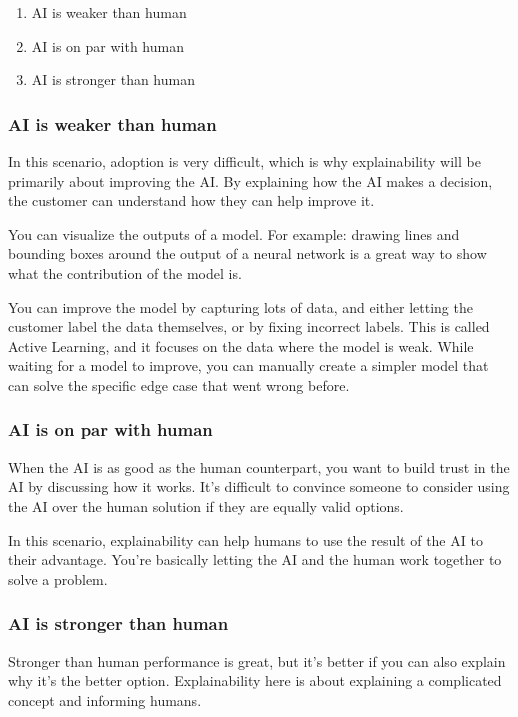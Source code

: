 \documentclass{article}
\begin{document}
\begin{enumerate}
    \item AI is weaker than human
    \item AI is on par with human
    \item AI is stronger than human
\end{enumerate}

\subsubsection{AI is weaker than human}

In this scenario, adoption is very difficult, which is why explainability
will be primarily about improving the AI. By explaining how the AI makes a decision,
the customer can understand how they can help improve it. 

You can visualize the outputs of a model. For example: drawing lines and bounding 
boxes around the output of a neural network is a great way to show what the 
contribution of the model is.

You can improve the model by capturing lots of data, and either letting the customer label
the data themselves, or by fixing incorrect labels. This is called Active Learning, and it
focuses on the data where the model is weak. 
While waiting for a model to improve, you can manually create a simpler model that can
solve the specific edge case that went wrong before.

\subsubsection{AI is on par with human}

When the AI is as good as the human counterpart, you want to build trust in the
AI by discussing how it works. It's difficult to convince someone to consider 
using the AI over the human solution if they are equally valid options. 

In this scenario, explainability can help humans to use the result of the AI 
to their advantage. You're basically letting the AI and the human work together
to solve a problem.


\subsubsection{AI is stronger than human}

Stronger than human performance is great, but it's better if you can also explain
why it's the better option. Explainability here is about explaining a complicated
concept and informing humans.
\end{document}
